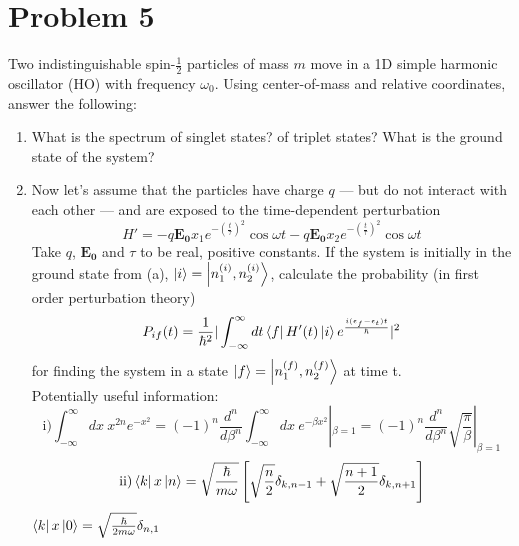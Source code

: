 \documentclass{article}
\begin{document}
\section*{Problem 5} 
Two indistinguishable spin-$\frac{1}{2}$ particles of mass $\textit{m}$ move in a 1D simple harmonic oscillator (HO) with frequency $\omega_0$. Using center-of-mass and relative coordinates, answer the following:
\begin{enumerate}[label=\alph*)]
	\item %
	What is the spectrum of singlet states? of triplet states? What is the ground state of the system?
	\item %
	Now let's assume that the particles have charge $\textit{q}$ --- but do not interact with each other --- and are exposed to the time-dependent perturbation
	\[
	H' = -q\mathbf{E_0}x_1e^{-\left(\frac{t}{\tau}\right)^2}\cos\omega t - q\mathbf{E_0}x_2e^{-\left(\frac{t}{\tau}\right)^2}\cos\omega t
	\]
	Take $\textit{q}$, $\mathbf{E_0}$ and $\tau$ to be real, positive constants. If the system is initially in the ground state from (a), $\ket{i} = \ket{n_{1}^{(i)},n_{2}^{(i)}}$, calculate the probability (in first order perturbation theory)
	\[
	P_{if}(t) = \frac{1}{\hbar^2} | \int_{-\infty}^{\infty}dt\bra{f}H'(t)\ket{i}e^{\frac{i(\epsilon_{f} - \epsilon_{t})t}{\hbar}}|^2
	\]
	for finding the system in a state $\ket{f}=\ket{n_{1}^{(f)},n_{2}^{(f)}}$ at time t. \\
	Potentially useful information:
	\[ \text{i)}
		\int_{-\infty}^{\infty}dx\:x^{2n}e^{-x^2} = (-1)^n \frac{d^n}{d\beta^n}\int_{-\infty}^{\infty}dx\:e^{-\beta x^2} |_{\beta = 1} = (-1)^n \frac{d^n}{d\beta^n} \sqrt{\frac{\pi}{\beta}} |_{\beta=1}
	\]
	\[ \text{ii)}
		\bra{k}x\ket{n} = \sqrt{\frac{\hbar}{m\omega}}\left[ \sqrt{\frac{n}{2}} \delta_{k,n-1}+\sqrt{\frac{n+1}{2}}\delta_{k,n+1}\right]
	\] 
	\hspace{3.5 cm} $\bra{k}x\ket{0} = \sqrt{\frac{\hbar}{2m\omega}}\delta_{n,1}$
\end{enumerate}
\end{document}
